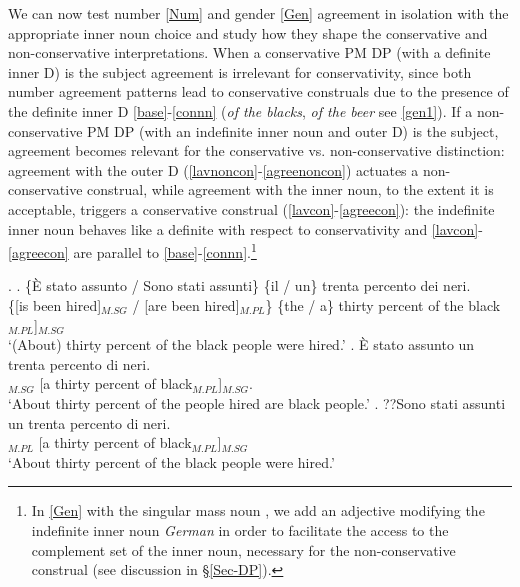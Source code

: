 \documentclass[charis, linguex]{glossa}
\begin{document}
We can now test number \ref{Num} and gender \ref{Gen} agreement in isolation with the appropriate inner noun choice and study how they shape the conservative and non-conservative interpretations. When a conservative PM DP (with a definite inner D) is the subject agreement is irrelevant for conservativity, since both number agreement patterns lead to conservative construals due to the presence of the definite inner D \ref{base}-\ref{connn} (\textit{of the blacks}, \textit{of the beer} see \ref{gen1}). If a non-conservative PM DP (with an indefinite inner noun and outer D) is the subject, agreement becomes relevant for the conservative vs. non-conservative distinction: agreement with the outer D (\ref{lavnoncon}-\ref{agreenoncon}) actuates a non-conservative construal, while agreement with the inner noun, to the extent it is acceptable, triggers a conservative construal (\ref{lavcon}-\ref{agreecon}): the indefinite inner noun behaves like a definite with respect to conservativity and  \ref{lavcon}-\ref{agreecon} are parallel to \ref{base}-\ref{connn}.\footnote{In \ref{Gen} with the singular mass noun , we add an adjective modifying the indefinite inner noun \textit{German}  in order to facilitate the access to the complement set of the inner noun, necessary for the non-conservative construal (see discussion in \S\ref{Sec-DP}).}
	
\ex. \label{Num} \ag. \{È stato assunto / Sono stati assunti\}  \{il / un\} trenta percento dei neri. \\
	   \{[is been hired]$_{M.SG}$ / [are been hired]$_{M.PL}$\}  \{the / a\} thirty percent {of the} black$_{M.PL}$]$_{M.SG}$  \\ 
	  \glt 	`(About) thirty percent of the black people were hired.'  \label{base} 
\bg. È stato assunto un trenta percento di neri. \\
		  [is been hired]$_{M.SG}$ [a thirty percent of black$_{M.PL}$]$_{M.SG}$.  \\
	\glt `About thirty percent of the people hired  are black people.'    \label{lavnoncon} 
  \cg. ??Sono stati assunti un trenta percento di neri. \\
		[are been hired]$_{M.PL}$ [a thirty percent of black$_{M.PL}$]$_{M.SG}$ \\ 	
		 \glt `About thirty percent of the black people were hired.' \label{lavcon}	
\end{document}

